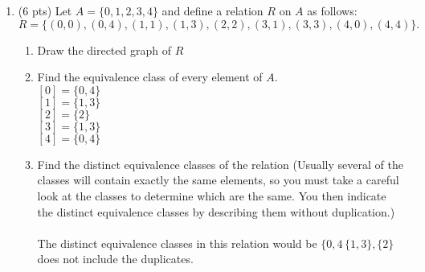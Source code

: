 \documentclass[12pt]{article}
\begin{document}
\begin{enumerate}
\item (6 pts)
Let $A = \{0, 1, 2, 3, 4\}$ and define a relation $R$ on $A$ as follows:
\[R = \{(0, 0), (0, 4), (1, 1), (1, 3), (2, 2), (3, 1), (3, 3), (4, 0), (4, 4)\}.\]
\begin{enumerate}
	\item Draw the directed graph of $R$\\
    \begin{center}
    \end{center}
	\item Find the equivalence class of every element of $A.$
    \\$[0] = \{0,4\}$
    \\$[1] = \{1,3\}$
    \\$[2] = \{2\}$
    \\$[3] = \{1,3\}$
    \\$[4] = \{0,4\}$
	\item Find  the distinct equivalence classes of the relation (Usually several of the classes 	will contain exactly the same elements, so you must take a careful look at the classes to determine which are the same. You then indicate the distinct equivalence 	classes by describing them without duplication.)\\
\\The distinct equivalence classes in this relation would be $\{0,4\,\{1,3\},\{2\}$ does not include the duplicates.
\end{enumerate}



\end{enumerate}
\end{document}
